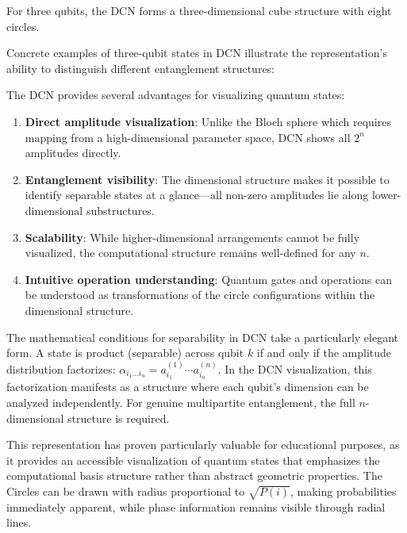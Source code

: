 \documentclass[%
 amsmath,amssymb,
 aps,
rmp,
]{revtex4-2}
\begin{document}


For three qubits, the DCN forms a three-dimensional cube structure with eight circles.

Concrete examples of three-qubit states in DCN illustrate the representation's ability to distinguish different entanglement structures:







The DCN provides several advantages for visualizing quantum states:

\begin{enumerate}
	\item \textbf{Direct amplitude visualization}: Unlike the Bloch sphere which requires mapping from a high-dimensional parameter space, DCN shows all $2^n$ amplitudes directly.
	\item \textbf{Entanglement visibility}: The dimensional structure makes it possible to identify separable states at a glance---all non-zero amplitudes lie along lower-dimensional substructures.
	\item \textbf{Scalability}: While higher-dimensional arrangements cannot be fully visualized, the computational structure remains well-defined for any $n$.
	\item \textbf{Intuitive operation understanding}: Quantum gates and operations can be understood as transformations of the circle configurations within the dimensional structure.
\end{enumerate}

The mathematical conditions for separability in DCN take a particularly elegant form. A state is product (separable) across qubit $k$ if and only if the amplitude distribution factorizes: $\alpha_{i_1 \ldots i_n} = a_{i_1}^{(1)} \cdots a_{i_n}^{(n)}$. In the DCN visualization, this factorization manifests as a structure where each qubit's dimension can be analyzed independently. For genuine multipartite entanglement, the full $n$-dimensional structure is required.

This representation has proven particularly valuable for educational purposes, as it provides an accessible visualization of quantum states that emphasizes the computational basis structure rather than abstract geometric properties. The Circles can be drawn with radius proportional to $\sqrt{P(i)}$, making probabilities immediately apparent, while phase information remains visible through radial lines.
\end{document}
